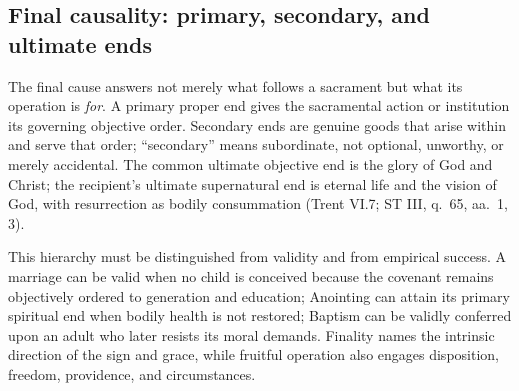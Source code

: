 \subsection{Final causality: primary, secondary, and ultimate ends}

The final cause answers not merely what follows a sacrament but what its operation is \emph{for}. A primary proper end gives the sacramental action or institution its governing objective order. Secondary ends are genuine goods that arise within and serve that order; ``secondary'' means subordinate, not optional, unworthy, or merely accidental. The common ultimate objective end is the glory of God and Christ; the recipient's ultimate supernatural end is eternal life and the vision of God, with resurrection as bodily consummation (Trent VI.7; ST III, q.~65, aa.~1, 3).

This hierarchy must be distinguished from validity and from empirical success. A marriage can be valid when no child is conceived because the covenant remains objectively ordered to generation and education; Anointing can attain its primary spiritual end when bodily health is not restored; Baptism can be validly conferred upon an adult who later resists its moral demands. Finality names the intrinsic direction of the sign and grace, while fruitful operation also engages disposition, freedom, providence, and circumstances.

